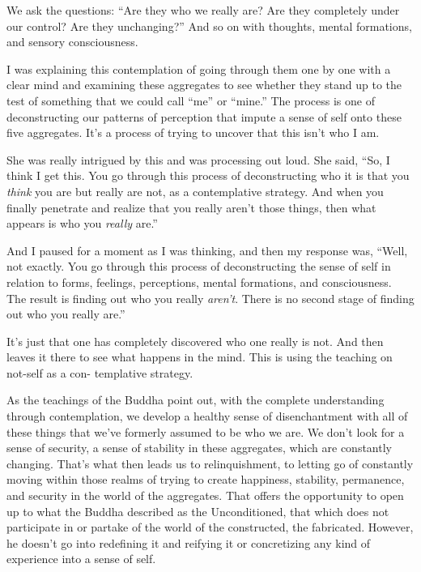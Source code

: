 We ask the questions: ``Are they who we really are? Are they completely under our control? Are they unchanging?'' And so on with thoughts, mental formations, and sensory consciousness.

I was explaining this contemplation of going through them one by one with a clear mind and examining these aggregates to see whether they stand up to the test of something that we could call ``me'' or ``mine.'' The process is one of deconstructing our patterns of perception that impute a sense of self onto these five aggregates. It's a process of trying to uncover that this isn't who I am.

She was really intrigued by this and was processing out \linebreak loud. She said, ``So, I think I get this. You go through this process of deconstructing who it is that you \emph{think} you are but really are not, as a contemplative strategy. And when you finally penetrate and realize that you really aren't those things, then what appears is who you \emph{really} are.''

And I paused for a moment as I was thinking, and then my response was, ``Well, not exactly. You go through this process of deconstructing the sense of self in relation to forms, feelings, perceptions, mental formations, and consciousness. The result is finding out who you really \emph{aren't}. There is no second stage of finding out who you really are.''

It's just that one has completely discovered who one really is not. And then leaves it there to see what happens in the mind. This is using the teaching on not-self as a con- \linebreak templative strategy.

As the teachings of the Buddha point out, with the complete understanding through contemplation, we develop a healthy sense of disenchantment with all of these things that we've formerly assumed to be who we are. We don't look for a sense of security, a sense of stability in these aggregates, which are constantly changing. That's what then leads us to relinquishment, to letting go of constantly moving within those realms of trying to create happiness, stability, permanence, and security in the world of the aggregates. That offers the opportunity to open up to what the Buddha described as \linebreak the Unconditioned, that which does not participate in or partake of the world of the constructed, the fabricated. However, he doesn't go into redefining it and reifying it or concretizing any kind of experience into a sense of self.{\parfillskip=0pt \par}

